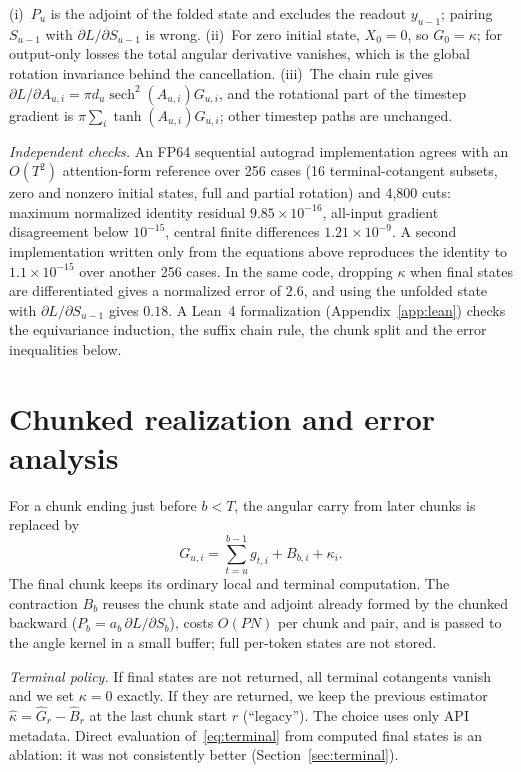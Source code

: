\begin{remark}
(i)~$P_u$ is the adjoint of the folded state and excludes the readout $y_{u-1}$; pairing $S_{u-1}$ with $\partial L/\partial S_{u-1}$ is wrong. (ii)~For zero initial state, $X_0=0$, so $G_0=\kappa$; for output-only losses the total angular derivative vanishes, which is the global rotation invariance behind the cancellation. (iii)~The chain rule gives $\partial L/\partial A_{u,i}=\pi d_u\operatorname{sech}^2(A_{u,i})G_{u,i}$, and the rotational part of the timestep gradient is $\pi\sum_i\tanh(A_{u,i})G_{u,i}$; other timestep paths are unchanged.
\end{remark}

\emph{Independent checks.} An FP64 sequential autograd implementation agrees with an $O(T^2)$ attention-form reference over 256 cases (16 terminal-cotangent subsets, zero and nonzero initial states, full and partial rotation) and 4{,}800 cuts: maximum normalized identity residual $9.85\times10^{-16}$, all-input gradient disagreement below $10^{-15}$, central finite differences $1.21\times10^{-9}$. A second implementation written only from the equations above reproduces the identity to $1.1\times10^{-15}$ over another 256 cases. In the same code, dropping $\kappa$ when final states are differentiated gives a normalized error of $2.6$, and using the unfolded state with $\partial L/\partial S_{u-1}$ gives $0.18$. A Lean~4 formalization (Appendix~\ref{app:lean}) checks the equivariance induction, the suffix chain rule, the chunk split and the error inequalities below.

\section{Chunked realization and error analysis}\label{sec:realization}
For a chunk ending just before $b<T$, the angular carry from later chunks is replaced by
\begin{equation}
G_{u,i}=\sum_{t=u}^{b-1}g_{t,i}+B_{b,i}+\kappa_i.\label{eq:chunk}
\end{equation}
The final chunk keeps its ordinary local and terminal computation. The contraction $B_b$ reuses the chunk state and adjoint already formed by the chunked backward ($P_b=a_b\,\partial L/\partial S_b$), costs $O(PN)$ per chunk and pair, and is passed to the angle kernel in a small buffer; full per-token states are not stored.

\emph{Terminal policy.} If final states are not returned, all terminal cotangents vanish and we set $\kappa=0$ exactly. If they are returned, we keep the previous estimator $\widehat\kappa=\widehat G_r-\widehat B_r$ at the last chunk start $r$ (``legacy''). The choice uses only API metadata. Direct evaluation of~\eqref{eq:terminal} from computed final states is an ablation: it was not consistently better (Section~\ref{sec:terminal}).

